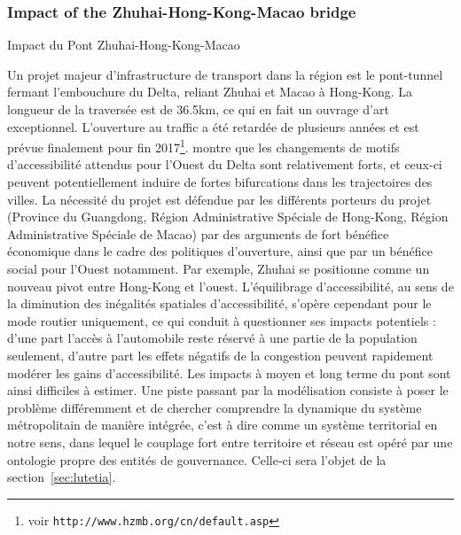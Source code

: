 \subsubsection{Impact of the Zhuhai-Hong-Kong-Macao bridge}{Impact du Pont Zhuhai-Hong-Kong-Macao}

Un projet majeur d'infrastructure de transport dans la région est le pont-tunnel fermant l'embouchure du Delta, reliant Zhuhai et Macao à Hong-Kong. La longueur de la traversée est de 36.5km, ce qui en fait un ouvrage d'art exceptionnel. L'ouverture au traffic a été retardée de plusieurs années et est prévue finalement pour fin 2017\footnote{voir \texttt{http://www.hzmb.org/cn/default.asp}}. \cite{zhou2016medium} montre que les changements de motifs d'accessibilité attendus pour l'Ouest du Delta sont relativement forts, et ceux-ci peuvent potentiellement induire de fortes bifurcations dans les trajectoires des villes. La nécessité du projet est défendue par les différents porteurs du projet (Province du Guangdong, Région Administrative Spéciale de Hong-Kong, Région Administrative Spéciale de Macao) par des arguments de fort bénéfice économique dans le cadre des politiques d'ouverture, ainsi que par un bénéfice social pour l'Ouest notamment. Par exemple, Zhuhai se positionne comme un nouveau pivot entre Hong-Kong et l'ouest. L'équilibrage d'accessibilité, au sens de la diminution des inégalités spatiales d'accessibilité, s'opère cependant pour le mode routier uniquement, ce qui conduit à questionner ses impacts potentiels : d'une part l'accès à l'automobile reste réservé à une partie de la population seulement, d'autre part les effets négatifs de la congestion peuvent rapidement modérer les gains d'accessibilité. Les impacts à moyen et long terme du pont sont ainsi difficiles à estimer. Une piste passant par la modélisation consiste à poser le problème différemment et de chercher comprendre la dynamique du système métropolitain de manière intégrée, c'est à dire comme un système territorial en notre sens, dans lequel le couplage fort entre territoire et réseau est opéré par une ontologie propre des entités de gouvernance. Celle-ci sera l'objet de la section~\ref{sec:lutetia}.




